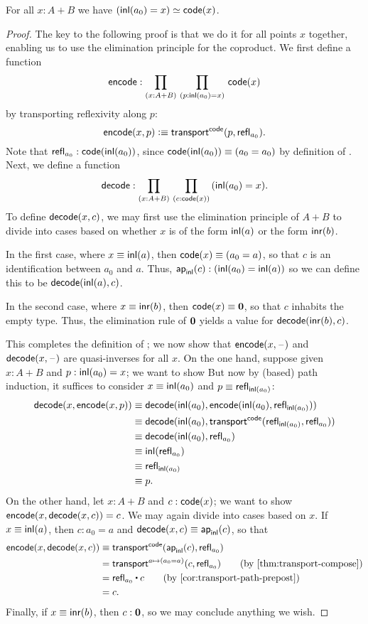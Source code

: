 \begin{thm}\label{thm:path-coprod}
  For all $x:A+B$ we have $({\mathsf{inl}}(a_0)=x) \simeq \mathsf{code}(x)$.
\end{thm}
\begin{proof}
  The key to the following proof is that we do it for all points $x$ together, enabling us to use the elimination principle for the coproduct.
  We first define a function
  \[ \encode : \prd{x:A+B}{p:\inl(a_0)=x} \code(x) \]
  by transporting reflexivity along $p$:
  \[ \mathsf{encode}(x,p) \vcentcolon\equiv \mathsf{transport}^{\mathsf{code}}(p,\mathsf{refl}_{a_0}). \]
  Note that $\mathsf{refl}_{a_0} : \mathsf{code}({\mathsf{inl}}(a_0))$, since $\mathsf{code}({\mathsf{inl}}(a_0))\equiv (a_0=a_0)$ by definition of \code.
  Next, we define a function
  \[ \decode : \prd{x:A+B}{c:\code(x)} (\inl(a_0)=x). \]
  To define $\mathsf{decode}(x,c)$, we may first use the elimination principle of $A+B$ to divide into cases based on whether $x$ is of the form ${\mathsf{inl}}(a)$ or the form ${\mathsf{inr}}(b)$.

  In the first case, where $x\equiv {\mathsf{inl}}(a)$, then $\mathsf{code}(x)\equiv (a_0=a)$, so that $c$ is an identification between $a_0$ and $a$.
  Thus, $\mathsf{ap}_{{\mathsf{inl}}}(c):({\mathsf{inl}}(a_0)={\mathsf{inl}}(a))$ so we can define this to be $\mathsf{decode}({\mathsf{inl}}(a),c)$.

  In the second case, where $x\equiv {\mathsf{inr}}(b)$, then $\mathsf{code}(x)\equiv \mathbf{0}$, so that $c$ inhabits the empty type.
  Thus, the elimination rule of $\mathbf{0}$ yields a value for $\mathsf{decode}({\mathsf{inr}}(b),c)$.

  This completes the definition of \decode; we now show that $\mathsf{encode}(x,{\mathord{\hspace{1pt}\text{--}\hspace{1pt}}})$ and $\mathsf{decode}(x,{\mathord{\hspace{1pt}\text{--}\hspace{1pt}}})$ are quasi-inverses for all $x$.
  On the one hand, suppose given $x:A+B$ and $p:{\mathsf{inl}}(a_0)=x$; we want to show
  But now by (based) path induction, it suffices to consider $x\equiv{\mathsf{inl}}(a_0)$ and $p\equiv \mathsf{refl}_{{\mathsf{inl}}(a_0)}$:
  \begin{align*}
    \mathsf{decode}(x,\mathsf{encode}(x,p))
    &\equiv \mathsf{decode}({\mathsf{inl}}(a_0),\mathsf{encode}({\mathsf{inl}}(a_0),\mathsf{refl}_{{\mathsf{inl}}(a_0)}))\\
    &\equiv \mathsf{decode}({\mathsf{inl}}(a_0),\mathsf{transport}^{\mathsf{code}}(\mathsf{refl}_{{\mathsf{inl}}(a_0)},\mathsf{refl}_{a_0}))\\
    &\equiv \mathsf{decode}({\mathsf{inl}}(a_0),\mathsf{refl}_{a_0})\\
    &\equiv {\ensuremath{{\mathsf{inl}}}}\mathopen{}\left({\mathsf{refl}_{a_0}}\right)\mathclose{}\\
    &\equiv \mathsf{refl}_{{\mathsf{inl}}(a_0)}\\
    &\equiv p.
  \end{align*}
  On the other hand, let $x:A+B$ and $c:\mathsf{code}(x)$; we want to show $\mathsf{encode}(x,\mathsf{decode}(x,c))=c$.
  We may again divide into cases based on $x$.
  If $x\equiv{\mathsf{inl}}(a)$, then $c:a_0=a$ and $\mathsf{decode}(x,c)\equiv \mathsf{ap}_{{\mathsf{inl}}}(c)$, so that
  \begin{align}
    \encode(x,\decode(x,c))
    &\jdeq \transfib{\code}{\apfunc{\inl}(c)}{\refl{a_0}}
    \notag\\
    &= \transfib{a\mapsto (a_0=a)}{c}{\refl{a_0}}
    \tag{by \cref{thm:transport-compose}}\\
    &= \refl{a_0} \ct c
    \tag{by \cref{cor:transport-path-prepost}}\\
    &= c. \notag
  \end{align}
  Finally, if $x\equiv {\mathsf{inr}}(b)$, then $c:\mathbf{0}$, so we may conclude anything we wish.
\end{proof}

